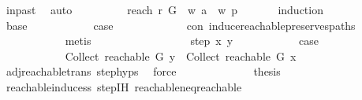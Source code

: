 \begin{isabellebody}
\ in{\isacharunderscore}{\kern0pt}past\ \isamarkupfalse%
\ auto\isanewline
\ \ \ \ \ \ \isamarkupfalse%
\ \isamarkupfalse%
\ reach{\isacharcolon}{\kern0pt}\ {\isachardoublequoteopen}r\ {\isasymrightarrow}\isactrlsup {\isacharasterisk}{\kern0pt}\isactrlbsub G\ {\isasymrestriction}\ {\isacharbraceleft}{\kern0pt}w{\isachardot}{\kern0pt}\ a\ {\isasymrightarrow}\isactrlsup {\isacharasterisk}{\kern0pt}\ w{\isacharbraceright}{\kern0pt}\isactrlesub \ p{\isachardoublequoteclose}\isanewline
\ \ \ \ \ \ \isamarkupfalse%
{\isacharparenleft}{\kern0pt}induction{\isacharparenright}{\kern0pt}\isanewline
\ \ \ \ \ \ \ \ \isamarkupfalse%
\ base\isanewline
\ \ \ \ \ \ \ \ \isamarkupfalse%
\ \isamarkupfalse%
\ {\isacharquery}{\kern0pt}case\isanewline
\ \ \ \ \ \ \ \ \ \ \isamarkupfalse%
\ \ con\ induce{\isacharunderscore}{\kern0pt}reachable{\isacharunderscore}{\kern0pt}preserves{\isacharunderscore}{\kern0pt}paths\isanewline
\ \ \ \ \ \ \ \ \ \ \isamarkupfalse%
\ {\isacharparenleft}{\kern0pt}metis{\isacharparenright}{\kern0pt}\ \isanewline
\ \ \ \ \ \ \isamarkupfalse%
\isanewline
\ \ \ \ \ \ \ \ \isamarkupfalse%
\ {\isacharparenleft}{\kern0pt}step\ x\ y{\isacharparenright}{\kern0pt}\isanewline
\ \ \ \ \ \ \ \ \isamarkupfalse%
\ \isamarkupfalse%
\ {\isacharquery}{\kern0pt}case\isanewline
\ \ \ \ \ \ \ \ \isamarkupfalse%
\ {\isacharminus}{\kern0pt}\isanewline
\ \ \ \ \ \ \ \ \ \ \isamarkupfalse%
\ {\isachardoublequoteopen}Collect\ {\isacharparenleft}{\kern0pt}reachable\ G\ y{\isacharparenright}{\kern0pt}\ {\isasymsubseteq}\ Collect\ {\isacharparenleft}{\kern0pt}reachable\ G\ x{\isacharparenright}{\kern0pt}{\isachardoublequoteclose}\isanewline
\ \ \ \ \ \ \ \ \ \ \ \ \isamarkupfalse%
\ adj{\isacharunderscore}{\kern0pt}reachable{\isacharunderscore}{\kern0pt}trans\ step{\isachardot}{\kern0pt}hyps{\isacharparenleft}{\kern0pt}{}{\isacharparenright}{\kern0pt}\ \isamarkupfalse%
\ force\isanewline
\ \ \ \ \ \ \ \ \ \ \isamarkupfalse%
\ \isamarkupfalse%
\ {\isacharquery}{\kern0pt}thesis\isanewline
\ \ \ \ \ \ \ \ \ \ \ \ \isamarkupfalse%
\ reachable{\isacharunderscore}{\kern0pt}induce{\isacharunderscore}{\kern0pt}ss\ step{\isachardot}{\kern0pt}IH\ reachable{\isacharunderscore}{\kern0pt}neq{\isacharunderscore}{\kern0pt}reachable{}\isanewline

\end{isabellebody}
